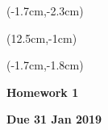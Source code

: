 \documentclass[12pt, oneside]{article}
\begin{document}
\begin{textblock*}{4cm}(-1.7cm,-2.3cm)
\end{textblock*}

\begin{textblock*}{8cm}(12.5cm,-1cm)
\end{textblock*}
\begin{textblock*}{13.5cm}(-1.7cm,-1.8cm)
\end{textblock*}

\vspace{1cm}

\begin{center}
\textbf{\Large Homework 1}

\textbf{Due 31 Jan 2019}
\end{center}
\end{document}
